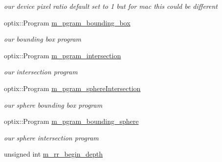 \begin{DoxyCompactItemize}
\begin{DoxyCompactList}\small\item\em our device pixel ratio default set to 1 but for mac this could be different \end{DoxyCompactList}\item 
optix\-::\-Program \hyperlink{class_path_tracer_scene_a9eff6b99097c6edb6e4da1ab6da1f494}{m\-\_\-pgram\-\_\-bounding\-\_\-box}
\begin{DoxyCompactList}\small\item\em our bounding box program \end{DoxyCompactList}\item 
optix\-::\-Program \hyperlink{class_path_tracer_scene_a50f096b5a5941c50a87fdd8864304852}{m\-\_\-pgram\-\_\-intersection}
\begin{DoxyCompactList}\small\item\em our intersection program \end{DoxyCompactList}\item 
\hypertarget{class_path_tracer_scene_aac4979f4c1814b66c83195f0e81149f4}{optix\-::\-Program \hyperlink{class_path_tracer_scene_aac4979f4c1814b66c83195f0e81149f4}{m\-\_\-pgram\-\_\-sphere\-Intersection}}\label{class_path_tracer_scene_aac4979f4c1814b66c83195f0e81149f4}

\begin{DoxyCompactList}\small\item\em our sphere bounding box program \end{DoxyCompactList}\item 
\hypertarget{class_path_tracer_scene_a7578510f6fb82fa8cc4e519ca5a0fc5f}{optix\-::\-Program \hyperlink{class_path_tracer_scene_a7578510f6fb82fa8cc4e519ca5a0fc5f}{m\-\_\-pgram\-\_\-bounding\-\_\-sphere}}\label{class_path_tracer_scene_a7578510f6fb82fa8cc4e519ca5a0fc5f}

\begin{DoxyCompactList}\small\item\em our sphere intersection program \end{DoxyCompactList}\item 
\hypertarget{class_path_tracer_scene_aedc9c1743d34386c4e093ffffd79958b}{unsigned int \hyperlink{class_path_tracer_scene_aedc9c1743d34386c4e093ffffd79958b}{m\-\_\-rr\-\_\-begin\-\_\-depth}}\label{class_path_tracer_scene_aedc9c1743d34386c4e093ffffd79958b}


\end{DoxyCompactItemize}
